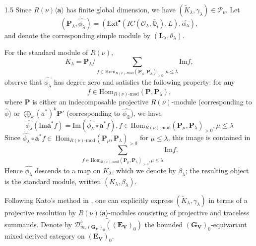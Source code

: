 \documentclass[10pt]{amsart}
\begin{document}
\begin{spacing}{1.5}
Since $R(\nu)\langle\mathbf{a}\rangle$ has finite global dimension, we have $(\widetilde{K}_{\lambda}, \gamma_{\lambda}) \in \mathcal{P}_{\nu}$. Let
\[
(\mathbf{P}_{\lambda}, \hat{\phi_{\lambda}}) = (\mathrm{Ext}^{\bullet}(IC(\mathcal{O}_{\lambda}, \overline{\mathbb{Q}}_l), L), \hat{\alpha_{\lambda}}),
\]
and denote the corresponding simple module by $(\mathbf{L}_{\lambda}, \theta_{\lambda})$.

For the standard module of $R(\nu)$,
\[
K_{\lambda} = \mathbf{P}_{\lambda} \big/ \sum_{f \in \mathrm{Hom}_{R(\nu)\text{-}\mathrm{mod}}(\mathbf{P}_{\mu}, \mathbf{P}_{\lambda})_{>0}, \mu \leq \lambda} \mathrm{Im} f,
\]
observe that $\hat{\phi_{\lambda}}$ has degree zero and satisfies the following property: for any
\[
f \in \mathrm{Hom}_{R(\nu)\text{-}\mathrm{mod}}(\mathbf{P}, \mathbf{P}_{\lambda}),
\]
where $\mathbf{P}$ is either an indecomposable projective $R(\nu)$-module (corresponding to $\hat{\phi}$) or $\bigoplus_k (a^*)^k \mathbf{P}'$ (corresponding to $\hat{\phi_{\oplus}}$), we have
\[
\hat{\phi_{\lambda}}(\mathrm{Im} \mathbf{a}^*f)=\mathrm{Im}(\hat{\phi_{\lambda}}\circ \mathbf{a}^*f),f \in \mathrm{Hom}_{R(\nu)\text{-}\mathrm{mod}}(\mathbf{P}_{\mu}, \mathbf{P}_{\lambda})_{>0}, \mu \leq \lambda
\]
Since $\hat{\phi_{\lambda}}\circ \mathbf{a}^*f\in\ \mathrm{Hom}_{R(\nu)\text{-}\mathrm{mod}}(\mathbf{P}_{\mu}, \mathbf{P}_{\lambda})_{>0}$ for $\mu \leq \lambda$, this image is contained in
\[
\sum_{f \in \mathrm{Hom}_{R(\nu)\text{-}\mathrm{mod}}(\mathbf{P}_{\mu}, \mathbf{P}_{\lambda})_{>0}, \mu \leq \lambda} \mathrm{Im} f.
\]
Hence $\hat{\phi_{\lambda}}$ descends to a map on $K_{\lambda}$, which we denote by $\beta_{\lambda}$; the resulting object is the standard module, written $(K_{\lambda}, \beta_{\lambda}).$ 

Following Kato's method in \cite{cd088214-009e-3813-9a86-97f9a299a24c}, one can explicitly express $(\widetilde{K}_{\lambda}, \gamma_{\lambda})$ in terms of a projective resolution by $R(\nu)\langle\mathbf{a}\rangle$-modules consisting of projective and traceless summands. Denote by $\widetilde{\mathcal{D}^{b}_{m,(\mathbf{G}_{\mathbf{V}})_0}((\mathbf{E}_{\mathbf{V}})_0)}$ the bounded $(\mathbf{G}_{\mathbf{V}})_0$-equivariant mixed derived category on $(\mathbf{E}_{\mathbf{V}})_0$.


\end{spacing}
\end{document}
